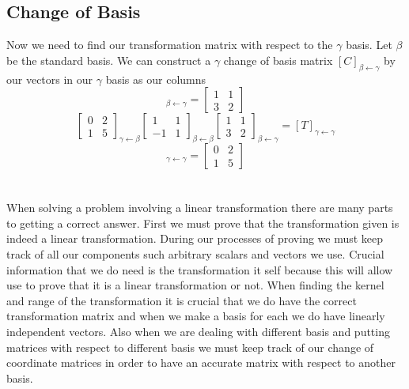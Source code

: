 \documentclass[12pt]{article}
\begin{document}
\subsection{Change of Basis}
Now we need to find our transformation matrix with respect to the $\gamma$ basis. Let $\beta$ be the standard basis. We can construct a $\gamma$ change of basis matrix $[C]_{ \beta \leftarrow \gamma}$ by our vectors in our $\gamma$ basis as our columns
\begin{equation*}[C]_{ \beta \leftarrow \gamma} = \begin{bmatrix}1 & 1 \\ 3 & 2\end{bmatrix}\end{equation*}
\begin{equation*}
\begin{bmatrix}0 & 2 \\ 1& 5 \end{bmatrix}_{\gamma \leftarrow \beta}
\begin{bmatrix} 1 & 1 \\ -1 & 1 \end{bmatrix}_{\beta \leftarrow \beta}
\begin{bmatrix} 1 & 1 \\ 3 & 2\end{bmatrix}_{ \beta \leftarrow \gamma} = [T] _{\gamma \leftarrow \gamma}\end{equation*}
\begin{equation*} [T] _{\gamma \leftarrow \gamma} = \begin{bmatrix}0 & 2 \\ 1& 5 \end{bmatrix}\end{equation*}
 \\\\
When solving a problem involving a linear transformation there are many parts to getting a correct answer. First we must prove that the transformation given is indeed a linear transformation. During our processes of proving we must keep track of all our components such arbitrary scalars and vectors we use. Crucial information that we do need is the transformation it self because this will allow use to prove that it is a linear transformation or not. When finding the kernel and range of the transformation it is crucial that we do have the correct transformation matrix and when we make a basis for each we do have linearly independent vectors. Also when we are dealing with different basis and putting matrices with respect to different basis we must keep track of our change of coordinate matrices in order to have an accurate matrix with respect to another basis.
\pagebreak
\end{document}
